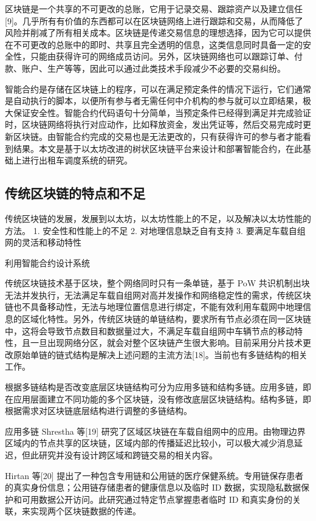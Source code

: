 区块链是一个共享的不可更改的总账，它用于记录交易、跟踪资产以及建立信任[9]。几乎所有有价值的东西都可以在区块链网络上进行跟踪和交易，从而降低了风险并削减了所有相关成本。区块链是传递交易信息的理想选择，因为它可以提供在不可更改的总账中的即时、共享且完全透明的信息，这类信息同时具备一定的安全性，只能由获得许可的网络成员访问。另外，区块链网络也可以跟踪订单、付款、账户、生产等等，因此可以通过此类技术手段减少不必要的交易纠纷。\par
智能合约是存储在区块链上的程序，可以在满足预定条件的情况下运行，它们通常是自动执行的脚本，以便所有参与者无需任何中介机构的参与就可以立即结果，极大保证安全性。智能合约代码语句十分简单，当预定条件已经得到满足并完成验证时，区块链网络将执行对应动作，比如释放资金，发出凭证等，然后交易完成时更新区块链。由智能合约完成的交易也是无法更改的，只有获得许可的参与者才能看到结果。本文是基于以太坊改进的树状区块链平台来设计和部署智能合约，在此基础上进行出租车调度系统的研究。\par

\subsection{传统区块链的特点和不足}
传统区块链的发展，发展到以太坊，以太坊性能上的不足，以及解决以太坊性能的方法。
1. 安全性和性能上的不足
2. 对地理信息缺乏自有支持
3. 要满足车载自组网的灵活和移动特性

利用智能合约设计系统

传统区块链技术基于区块，整个网络同时只有一条单链，基于 PoW 共识机制出块无法并发执行，无法满足车载自组网对高并发操作和网络稳定性的需求，传统区块链也不具备移动性，无法与地理位置信息进行绑定，不能有效利用车载网中地理信息的区域化特性。另外，传统区块链的单链结构，要求所有节点必须在同一区块链中，这将会导致节点数目和数据量过大，不满足车载自组网中车辆节点的移动特性，且一旦出现网络分区，就会对整个区块链产生很大影响。目前采用分片技术更改原始单链的链式结构是解决上述问题的主流方法[18]。当前也有多链结构的相关工作。\par
根据多链结构是否改变底层区块链结构可分为应用多链和结构多链。应用多链，即在应用层面建立不同功能的多个区块链，没有修改底层区块链结构。结构多链，即根据需求对区块链底层结构进行调整的多链结构。\par
应用多链
Shrestha 等[19] 研究了区域区块链在车载自组网中的应用。由物理边界区域内的节点共享的区块链，区域内部的传播延迟比较小，可以极大减少消息延迟，但此研究并没有设计跨区域和跨链交易的相关内容。\par
Hirtan 等[20] 提出了一种包含专用链和公用链的医疗保健系统。专用链保存患者的真实身份信息；公用链存储患者的健康信息以及临时 ID 数据，实现隐私数据保护和可用数据公开访问。此研究通过特定节点掌握患者临时 ID 和真实身份的关联，来实现两个区块链数据的传递。\par

